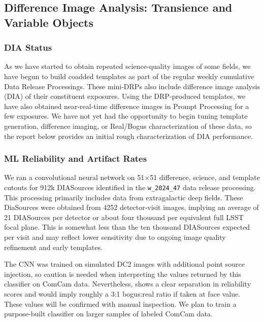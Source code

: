 \subsection{Difference Image Analysis: Transience and Variable Objects}
\label{sec:dia_transient_variable}


\subsubsection{DIA Status}

As we have started to obtain repeated science-quality images of some fields, we have begun to build coadded templates as part of the regular weekly cumulative Data Release Processings. 
These mini-DRPs also include difference image analysis (DIA) of their constituent exposures.
Using the DRP-produced templates, we have also obtained near-real-time difference images in Prompt Processing for a few exposures. 
We have not yet had the opportunity to begin tuning template generation, difference imaging, or Real/Bogus characterization of these data, so the report below provides an initial rough characterization of DIA performance. 

\subsubsection{ML Reliability and Artifact Rates}

We ran a convolutional neural network on 51$\times$51 difference, science, and template cutouts for 912k DIASources identified in the \texttt{w\_2024\_47} data release processing.  
This processing primarily includes data from extragalactic deep fields.
These DiaSources were obtained from 4252 detector-visit images, implying an average of 21 DIASources per detector or about four thousand per equivalent full LSST focal plane.
This is somewhat less than the ten thousand DIASources expected per visit and may reflect lower sensitivity due to ongoing image quality refinement and early templates.

The CNN was trained on simulated DC2 images with additional point source injection, so caution is needed when interpreting the values returned by this classifier on ComCam data.
Nevertheless,   shows a clear separation in reliability scores and would imply roughly a 3:1 bogus:real ratio if taken at face value.
These values will be confirmed with manual inspection.
We plan to train a purpose-built classifier on larger samples of labeled ComCam data.

